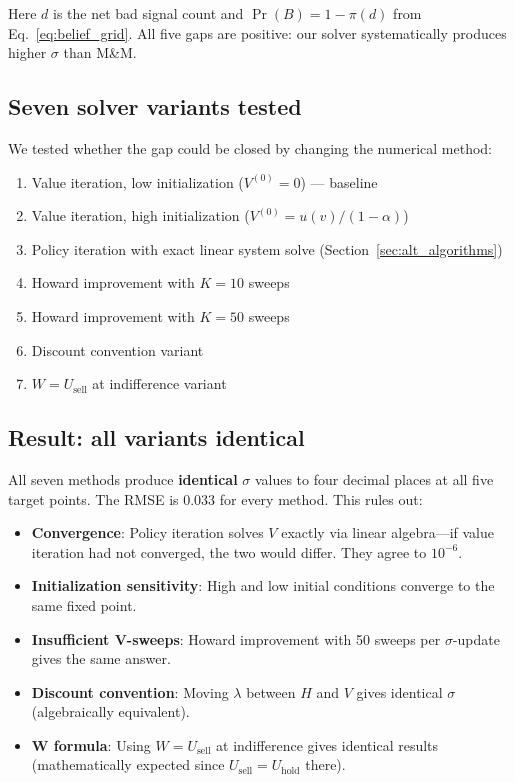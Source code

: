 \documentclass[11pt]{article}
\begin{document}
Here $d$ is the net bad signal count and $\Pr(B) = 1 - \pi(d)$ from
Eq.~\eqref{eq:belief_grid}. All five gaps are positive: our solver
systematically produces higher $\sigma$ than M\&M.

\subsection{Seven solver variants tested}

We tested whether the gap could be closed by changing the numerical method:

\begin{enumerate}
    \item Value iteration, low initialization ($V^{(0)} = 0$) --- baseline
    \item Value iteration, high initialization ($V^{(0)} = u(v)/(1-\alpha)$)
    \item Policy iteration with exact linear system solve
          (Section~\ref{sec:alt_algorithms})
    \item Howard improvement with $K = 10$ sweeps
    \item Howard improvement with $K = 50$ sweeps
    \item Discount convention variant
    \item $W = U_{\text{sell}}$ at indifference variant
\end{enumerate}

\subsection{Result: all variants identical}

All seven methods produce \textbf{identical} $\sigma$ values to four decimal
places at all five target points. The RMSE is 0.033 for every method. This
rules out:

\begin{itemize}
    \item \textbf{Convergence}: Policy iteration solves $V$ exactly via
    linear algebra---if value iteration had not converged, the two would
    differ. They agree to $10^{-6}$.
    \item \textbf{Initialization sensitivity}: High and low initial conditions
    converge to the same fixed point.
    \item \textbf{Insufficient V-sweeps}: Howard improvement with 50 sweeps
    per $\sigma$-update gives the same answer.
    \item \textbf{Discount convention}: Moving $\lambda$ between $H$ and $V$
    gives identical $\sigma$ (algebraically equivalent).
    \item \textbf{W formula}: Using $W = U_{\text{sell}}$ at indifference
    gives identical results (mathematically expected since
    $U_{\text{sell}} = U_{\text{hold}}$ there).
\end{itemize}
\end{document}

